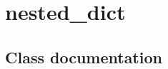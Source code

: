 \documentclass[letterpaper,10pt,english]{sphinxmanual}
\begin{document}
\section{nested\_dict}
\label{nested_dict:nested-dict}\label{nested_dict::doc}\label{nested_dict:module-nested_dict}

\subsection{Class documentation}
\label{nested_dict:class-documentation}

\begin{fulllineitems}
\label{nested_dict:nested_dict.nested_dict}
\end{fulllineitems}
\end{document}
